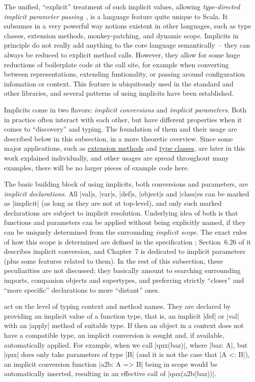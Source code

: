 The unified, \enquote{explicit} treatment of such implicit values, allowing \emph{type-directed
  implicit parameter passing}~\cite{oliveira2010:type-classes}, is a language feature quite unique
to Scala. It subsumes in a very powerful way notions existent in other languages, such as type
classes, extension methods, monkey-patching, and dynamic scope. Implicits in principle do not really
add anything to the core language semantically~-- they can always be reduced to explicit method
calls. However, they allow for some huge reductions of boilerplate code at the call site, for
example when converting between representations, extending funtionality, or passing around
configuration infomation or context. This feature is ubiquitously used in the standard and other
libraries, and several patterns of using implicits have been established.

Implicits come in two flavors: \emph{implicit conversions} and \emph{implicit parameters}. Both in
practice often interact with each other, but have different properties when it comes to
\enquote{discovery} and typing. The foundation of them and their usage are described below in this
subsection, in a more theoretic overview. Since some major applications, such as
\hyperref[sec:extensions]{extension methods} and \hyperref[sec:type_classes]{type classes}, are
later in this work explained individually, and other usages are spread throughout many examples,
there will be no larger pieces of example code here.

The basic building block of using implicits, both conversions and parameters, are
\emph{implicit declarations}. All |val|s, |var|s, |def|s, |object|s and |class|es can be marked as
|implicit| (as long as they are not at top-level), and only such marked declarations are subject to
implicit resolution. Underlying idea of both is that functions and parameters can be applied without
being explicitly named, if they can be uniquely determined from the surrounding \emph{implicit
  scope}. The exact rules of how this scope is determined are defined in the specification
\cite{odersky2014:scala_spec}; Section~6.26 of it describes implicit conversion, and Chapter~7 is
dedicated to implicit parameters (plus some features related to them). In the rest of this
subsection, these peculiarities are not discussed; they basically amount to searching surrounding
imports, companion objects and supertypes, and preferring strictly \enquote{closer} and
\enquote{more specific} declarations to more \enquote{distant} ones.

\pagebreak[4]
 act on the level of typing context and method names. They are
declared by providing an implicit value of a function type, that is, an implicit |def| or |val| with
an |apply| method of suitable type. If then an object in a context does not have a compatible type,
an implicit conversion is sought and, if available, automatically applied. For example, when we call
|qux(baz)|, where |baz: A|, but |qux| does only take parameters of type |B| (and it is not the case
that |A <: B|), an implicit conversion function |a2b: A => B| being in scope would be automatically
inserted, resulting in an effective call of |qux(a2b(baz))|.

